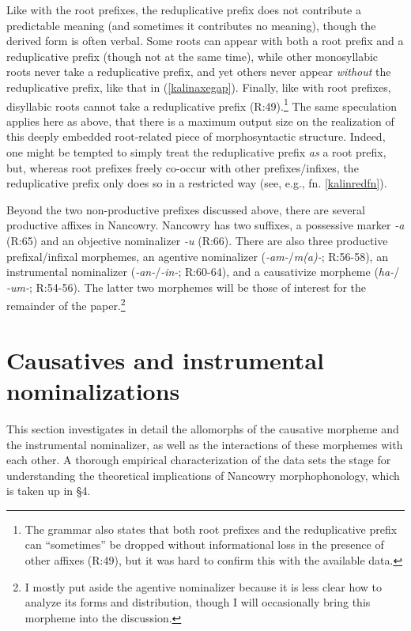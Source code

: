 \documentclass[output=paper,colorlinks,citecolor=brown,
]{langscibook}
\begin{document}
\noindent Like with the root prefixes, the reduplicative prefix does not contribute a predictable meaning (and sometimes it contributes no meaning), though the derived form is often verbal. Some roots can appear with both a root prefix and a reduplicative prefix (though not at the same time), while other monosyllabic roots never take a reduplicative prefix, and yet others never appear \textit{without} the reduplicative prefix, like that in (\ref{kalinaxegap}). Finally, like with root prefixes, disyllabic roots cannot take a reduplicative prefix (R:49).\footnote{The grammar also states that both root prefixes and the reduplicative prefix can ``sometimes'' be dropped without informational loss in the presence of other affixes (R:49), but it was hard to confirm this with the available data.} The same speculation applies here as above, that there is a maximum output size on the realization of this deeply embedded root-related piece of morphosyntactic structure. Indeed, one might be tempted to simply treat the reduplicative prefix {\it as} a root prefix, but, whereas root prefixes freely co-occur with other  prefixes/infixes, the reduplicative prefix only does so in a restricted way (see, e.g., fn. \ref{kalinredfn}).

Beyond the two non-productive prefixes discussed above, there are several productive affixes in Nancowry. Nancowry has two suffixes, a possessive marker \textit{-a} (R:65) and an objective nominalizer \textit{-u} (R:66). There are also three productive prefixal/infixal morphemes, an agentive nominalizer (\textit{-am-}/\textit{m(a)-}; R:56-58), an instrumental nominalizer (\textit{-an-}/\textit{-in-}; R:60-64), and a causativize morpheme (\textit{ha-}/ \textit{-um-}; R:54-56). The latter two morphemes will be those of interest for the remainder of the paper.\footnote{I mostly put aside the agentive nominalizer because it is less clear how to analyze its forms and distribution, though I will occasionally bring this morpheme into the discussion.}

\section{Causatives and instrumental nominalizations}

This section investigates in detail the allomorphs of the causative morpheme and the instrumental nominalizer, as well as the interactions of these morphemes with each other. A thorough empirical characterization of the data sets the stage for understanding the theoretical implications of Nancowry morphophonology, which is taken up in \S4.
\end{document}
